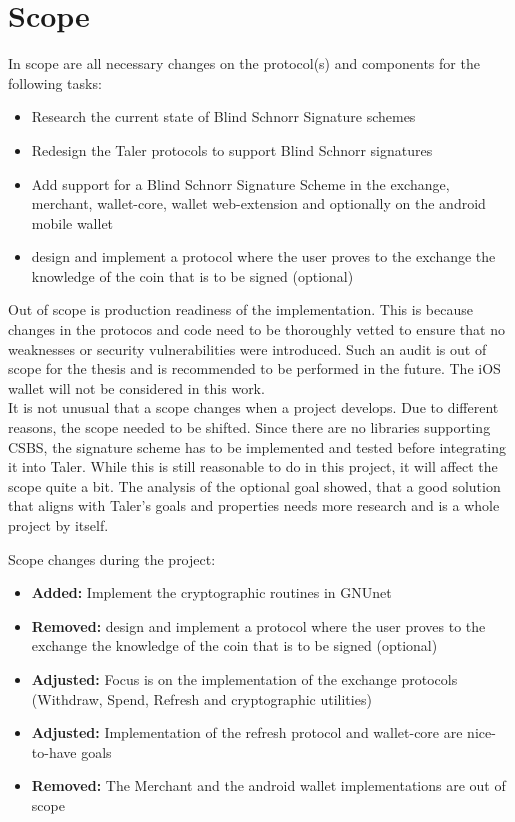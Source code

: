 \section{Scope}
\label{sec:scope}
In scope are all necessary changes on the protocol(s) and components for the following tasks:
\begin{itemize}
    \item Research the current state of Blind Schnorr Signature schemes
    \item Redesign the Taler protocols to support Blind Schnorr signatures
    \item Add support for a Blind Schnorr Signature Scheme in the exchange, merchant, wallet-core, wallet web-extension and optionally on the android mobile wallet
    \item design and implement a protocol where the user proves to the exchange the knowledge of the coin that is to be signed (optional)
\end{itemize}

Out of scope is production readiness of the implementation.
This is because changes in the protocos and code need to be thoroughly vetted to ensure that no weaknesses or security vulnerabilities were introduced.
Such an audit is out of scope for the thesis and is recommended to be performed in the future.
The iOS wallet will not be considered in this work.
\\
It is not unusual that a scope changes when a project develops.
Due to different reasons, the scope needed to be shifted.
Since there are no libraries supporting \gls{CSBS}, the signature scheme has to be implemented and tested before integrating it into Taler.
While this is still reasonable to do in this project, it will affect the scope quite a bit.
The analysis of the optional goal showed, that a good solution that aligns with Taler's goals and properties needs more research and is a whole project by itself.

Scope changes during the project:
\begin{itemize}
    \item \textbf{Added:} Implement the cryptographic routines in GNUnet
    \item \textbf{Removed: } design and implement a protocol where the user proves to the exchange the knowledge of the coin that is to be signed (optional)
    \item \textbf{Adjusted: } Focus is on the implementation of the exchange protocols (Withdraw, Spend, Refresh and cryptographic utilities)
    \item \textbf{Adjusted: } Implementation of the refresh protocol and wallet-core are nice-to-have goals
    \item \textbf{Removed: } The Merchant and the android wallet implementations are out of scope
\end{itemize}
